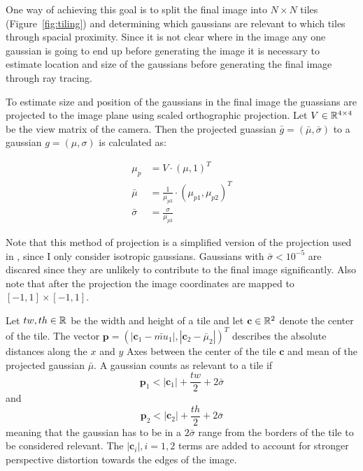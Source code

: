 \documentclass[a4paper, 11pt]{memoir}
\begin{document}
    One way of achieving this goal is to split the final image into $N \times N$ tiles (\eg Figure~\ref{fig:tiling}) and determining which gaussians
    are relevant to which tiles through spacial proximity. Since it is not clear where in the image any one gaussian is
    going to end up before generating the image it is necessary to estimate location and size of the gaussians before
    generating the final image through ray tracing.

    To estimate size and position of the gaussians in the final image the guassians are projected to the image plane using
    scaled orthographic projection. Let $V \in \mathbb{R}^{4 \times 4}$ be the view matrix of the camera. Then the projected guassian
    $\bar{g} = (\bar{\mu}, \bar{\sigma})$ to a gaussian $g = (\mu, \sigma)$ is calculated as:

    \begin{align}
        \mu_p &= V \cdot (\mu, 1)^T\\
        \bar{\mu} &= \frac{1}{\mu_{p3}} \cdot (\mu_{p1}, \mu_{p2})^T\\
        \bar{\sigma} &= \frac{\sigma}{\mu_{p3}}
    \end{align}

    Note that this method of projection is a simplified version of the projection used in \cite{kerbl3Dgaussians}, since I only consider isotropic gaussians.
    Gaussians with $\bar{\sigma} < 10^{-5}$ are discared since they are unlikely to contribute to the final image significantly. Also note that after the projection
    the image coordinates are mapped to $[-1, 1] \times [-1, 1]$.

    Let $tw, th \in \mathbb{R}$ be the width and height of a tile and let $\mathbf{c} \in \mathbb{R}^2$ denote the center of the tile. The vector $\mathbf{p} = (|\mathbf{c}_1 - \bar{mu}_1|, |\mathbf{c}_2 - \bar{\mu}_2|)^T$
    describes the absolute distances along the $x$ and $y$ Axes between the center of the tile $\mathbf{c}$ and mean of the projected gaussian $\bar{\mu}$.
    A gaussian counts as relevant to a tile if
    \begin{equation}
        \mathbf{p}_1 < |\mathbf{c}_1| + \frac{tw}{2} + 2\bar{\sigma}
    \end{equation}
    and 
    \begin{equation}
        \mathbf{p}_2 < |\mathbf{c}_2| + \frac{th}{2} + 2\bar{\sigma}
    \end{equation}
    meaning that the gaussian has to be in a $2\bar{\sigma}$ range from the borders of the tile to be considered relevant.
    The $|\mathbf{c}_i|, i=1,2$ terms are added to account for stronger perspective distortion towards the edges of the image.
\end{document}
